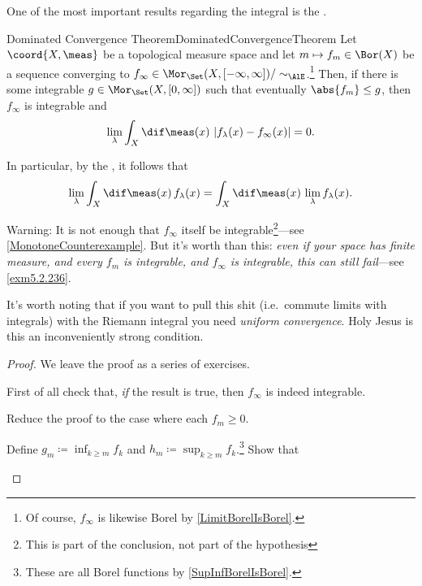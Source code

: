 One of the most important results regarding the integral is the .
\begin{thm}{Dominated Convergence Theorem}{DominatedConvergenceTheorem}
Let $\coord{X,\meas}$ be a topological measure space and let $m\mapsto f_m\in \Bor (X)$ be a sequence converging to $f_\infty \in \Mor _{\Set}(X,[-\infty ,\infty ])/\sim _{\AlE}$.\footnote{Of course, $f_{\infty}$ is likewise Borel by \cref{LimitBorelIsBorel}.}  Then, if there is some integrable $g\in \Mor _{\Set}(X,[0,\infty ])$ such that eventually $\abs{f_m}\leq g$, then $f_\infty$ is integrable and
\begin{equation}
\lim _\lambda \int _X\dif \meas (x)\, \left| f_\lambda (x)-f_\infty (x)\right| =0.
\end{equation}
\begin{rmk}
In particular, by the , it follows that
\intomargin
\begin{equation}
\lim _\lambda \int _X\dif \meas (x)\, f_\lambda (x)=\int _X\dif \meas (x)\, \lim _\lambda f_\lambda (x).
\end{equation}
\end{rmk}
\begin{wrn}
Warning:  It is not enough that $f_\infty$ itself be integrable\footnote{This is part of the conclusion, not part of the hypothesis}---see \cref{MonotoneCounterexample}.  But it's worth than this:  \emph{even if your space has finite measure, and every $f_m$ is integrable, and $f_\infty$ is integrable, this can still fail}---see \cref{exm5.2.236}.
\end{wrn}
\begin{rmk}
It's worth noting that if you want to pull this shit (i.e.\ commute limits with integrals) with the Riemann integral you need \emph{uniform convergence}.  Holy Jesus is this an inconveniently strong condition.
\end{rmk}
\begin{proof}
We leave the proof as a series of exercises.
\begin{exr}{}{}
First of all check that, \emph{if} the result is true, then $f_\infty$ is indeed integrable.
\end{exr}
\begin{exr}{}{}
Reduce the proof to the case where each $f_m\geq 0$.
\end{exr}
\begin{exr}[breakable=false]{}{}
Define $g_m\coloneqq \inf _{k\geq m}f_k$ and $h_m\coloneqq \sup _{k\geq m}f_k$.\footnote{These are all Borel functions by \cref{SupInfBorelIsBorel}.}  Show that

\end{exr}
\end{proof}
\end{thm}
